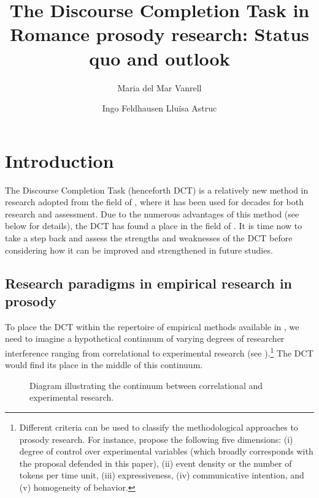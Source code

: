 \documentclass[output=paper]{LSP/langsci}
\author{Maria del Mar Vanrell\affiliation{Universitat de les Illes Balears}\and
Ingo Feldhausen\affiliation{Goethe-Universität Frankfurt am Main}\lastand
Lluïsa Astruc\affiliation{The Open University}
}
\title{The Discourse Completion Task in Romance prosody research: Status quo and outlook}
\begin{document}
\label{chap:van}\label{ch:6}

\section{Introduction}
\label{sec:van:1}
The Discourse Completion Task (henceforth DCT) is a relatively new method in  research adopted from the field of , where it has been used for decades for both research and assessment. Due to the numerous advantages of this method (see  below for details), the DCT has found a place in the field of . It is time now to take a step back and assess the strengths and weaknesses of the DCT before considering how it can be improved and strengthened in future studies. 

\subsection{Research paradigms in empirical research in prosody}
\label{sec:van:1.1}
To place the DCT within the repertoire of empirical methods available in , we need to imagine a hypothetical continuum of varying degrees of researcher interference ranging from correlational to experimental research (see ).\footnote{Different criteria can be used to classify the methodological approaches to prosody research. For instance, \citet{Niebuhr2015} propose the following five dimensions: (i) degree of control over experimental variables (which broadly corresponds with the proposal defended in this paper), (ii) event density or the number of tokens per time unit, (iii) expressiveness, (iv) communicative intention, and (v) homogeneity of behavior.} The DCT would find its place in the middle of this continuum. 
\begin{figure}
\caption{Diagram illustrating the continuum between correlational and experimental research.}
\label{fig:van:1} 
\end{figure}
\end{document}
